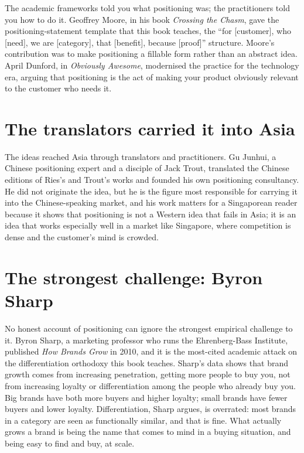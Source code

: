 \documentclass[10pt,twoside,openany]{memoir}
\newcommand{\needspacehead}{\needspace{4\baselineskip}}
\let\oldsection\section
\renewcommand{\section}{\needspacehead\oldsection}
\begin{document}
The academic frameworks told you what positioning was; the practitioners
told you how to do it. Geoffrey Moore, in his book \emph{Crossing the
Chasm}\cite{moore1991}, gave the positioning-statement template that
this book teaches, the ``for {[}customer{]}, who {[}need{]}, we are
{[}category{]}, that {[}benefit{]}, because {[}proof{]}'' structure.
Moore's contribution was to make positioning a fillable form rather than
an abstract idea. April Dunford, in \emph{Obviously
Awesome}\cite{dunford2019}, modernised the practice for the technology
era, arguing that positioning is the act of making your product
obviously relevant to the customer who needs it.

\section{The translators carried it into
Asia}\label{the-translators-carried-it-into-asia}

The ideas reached Asia through translators and practitioners. Gu Junhui,
a Chinese positioning expert and a disciple of Jack Trout, translated
the Chinese editions of Ries's and Trout's works and founded his own
positioning consultancy. He did not originate the idea, but he is the
figure most responsible for carrying it into the Chinese-speaking
market, and his work matters for a Singaporean reader because it shows
that positioning is not a Western idea that fails in Asia; it is an idea
that works especially well in a market like Singapore, where competition
is dense and the customer's mind is crowded.

\section{The strongest challenge: Byron
Sharp}\label{the-strongest-challenge-byron-sharp}

No honest account of positioning can ignore the strongest empirical
challenge to it. Byron Sharp, a marketing professor who runs the
Ehrenberg-Bass Institute, published \emph{How Brands
Grow}\cite{sharp2010} in 2010, and it is the most-cited academic attack
on the differentiation orthodoxy this book teaches. Sharp's data shows
that brand growth comes from increasing penetration, getting more people
to buy you, not from increasing loyalty or differentiation among the
people who already buy you. Big brands have both more buyers and higher
loyalty; small brands have fewer buyers and lower loyalty.
Differentiation, Sharp argues, is overrated: most brands in a category
are seen as functionally similar, and that is fine. What actually grows
a brand is being the name that comes to mind in a buying situation, and
being easy to find and buy, at scale.
\end{document}
